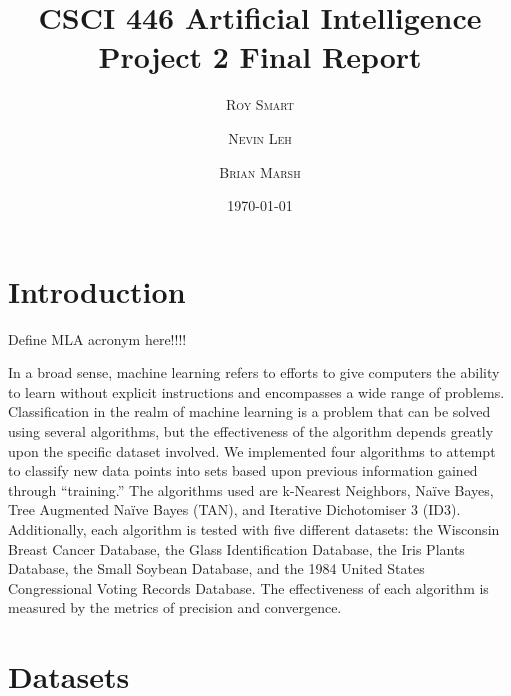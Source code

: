 \documentclass{article}
\title{\vspace{-15mm}\fontsize{24pt}{10pt}\selectfont\textbf{CSCI 446 Artificial Intelligence \\ Project 2 Final Report} \\[-2mm]} %
\date{\today}
\author{
\large
\textsc{Roy Smart} \and \textsc{Nevin Leh} \and \textsc{Brian Marsh}\\[2mm] %
}
\begin{document}
\maketitle %

\thispagestyle{fancy} %



\normalsize

\begin{abstract}
	
\end{abstract}
\section{Introduction}

Define MLA acronym here!!!!

	In a broad sense, machine learning refers to efforts to give computers the ability to learn without explicit instructions and encompasses a wide range of problems.  Classification in the realm of machine learning is a problem that can be solved using several algorithms, but the effectiveness of the algorithm depends greatly upon the specific dataset involved.  We implemented four algorithms to attempt to classify new data points into sets based upon previous information gained through “training.”  The algorithms used are k-Nearest Neighbors, Naïve Bayes, Tree Augmented Naïve Bayes (TAN), and Iterative Dichotomiser 3 (ID3).  Additionally, each algorithm is tested with five different datasets: the Wisconsin Breast Cancer Database, the Glass Identification Database, the Iris Plants Database, the Small Soybean Database, and the 1984 United States Congressional Voting Records Database.  The effectiveness of each algorithm is measured by the metrics of precision and convergence.  

\section{Datasets}
\end{document}
